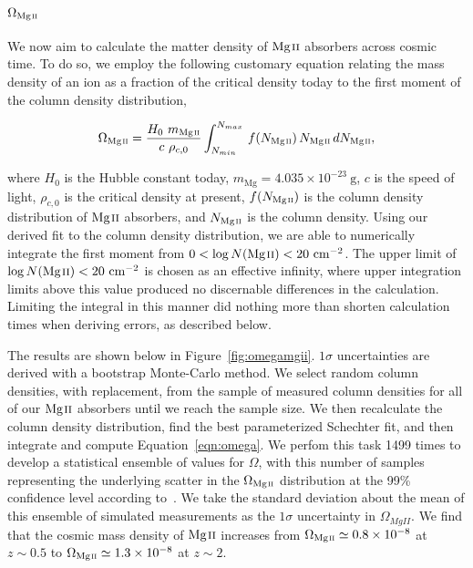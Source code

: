 \documentclass[iop,apj,numberedappendix,appendixfloats,twocolappendix]{emulateapj}
\begin{document}

\subsection{$\Omega_{\hbox{\scriptsize {\MgII}}}$}
\label{omegamgii}

We now aim to calculate the matter density of ${\hbox{{\rm Mg}\kern 0.1em{\sc ii}}}$ absorbers across cosmic time. To do so, we employ the following customary equation relating the mass density of an ion as a fraction of the critical density today to the first moment of the column density distribution,

\begin{equation}
\Omega_{\hbox{\scriptsize {\MgII}}} = \frac{H_0\  m_{\hbox{\scriptsize {\MgII}}}}{c\ \rho_{c,0}} \int_{N_{min}}^{N_{max}}\, f (N_{\hbox{\scriptsize {\MgII}}})\, N_{\hbox{\scriptsize {\MgII}}}\, dN_{\hbox{\scriptsize {\MgII}}} ,
\label{eqn:omega}
\end{equation}

\noindent where $H_0$ is the Hubble constant today, $m_{\mathrm{Mg}} = 4.035 \times 10^{-23}~\mathrm{g}$, $c$ is the speed of light, $\rho_{c,0}$ is the critical density at present, $f(N_{\hbox{\scriptsize {\MgII}}})$ is the column density distribution of ${\hbox{{\rm Mg}\kern 0.1em{\sc ii}}}$ absorbers, and $N_{\hbox{\scriptsize {\MgII}}}$ is the column density. Using our derived fit to the column density distribution, we are able to numerically integrate the first moment from $0 < \log N({\hbox{{\rm Mg}\kern 0.1em{\sc ii}}}) < 20~\mathrm{cm^{-2}}$. The upper limit of $\log N({\hbox{{\rm Mg}\kern 0.1em{\sc ii}}}) < 20~\mathrm{cm^{-2}}$ is chosen as an effective infinity, where upper integration limits above this value produced no discernable differences in the calculation. Limiting the integral in this manner did nothing more than shorten calculation times when deriving errors, as described below.

The results are shown below in Figure~\ref{fig:omegamgii}. $1\sigma$ uncertainties are derived with a bootstrap Monte-Carlo method. We select random column densities, with replacement, from the sample of measured column densities for all of our ${\hbox{{\rm Mg}\kern 0.1em{\sc ii}}}$ absorbers until we reach the sample size. We then recalculate the column density distribution, find the best parameterized Schechter fit, and then integrate and compute Equation~\ref{eqn:omega}. We perfom this task 1499 times to develop a statistical ensemble of values for $\Omega$, with this number of samples representing the underlying scatter in the $\Omega_{\hbox{\scriptsize {\MgII}}}$ distribution at the 99\% confidence level according to~\cite{Davidson2000bootstrap}. We take the standard deviation about the mean of this ensemble of simulated measurements as the $1\sigma$ uncertainty in $\Omega_{MgII}$. We find that the cosmic mass density of ${\hbox{{\rm Mg}\kern 0.1em{\sc ii}}}$ increases from $\Omega_{\hbox{\scriptsize {\MgII}}} \simeq 0.8\times10^{-8}$ at $z \sim 0.5$ to $\Omega_{\hbox{\scriptsize {\MgII}}} \simeq 1.3\times10^{-8}$ at $z \sim 2$.
\end{document}
